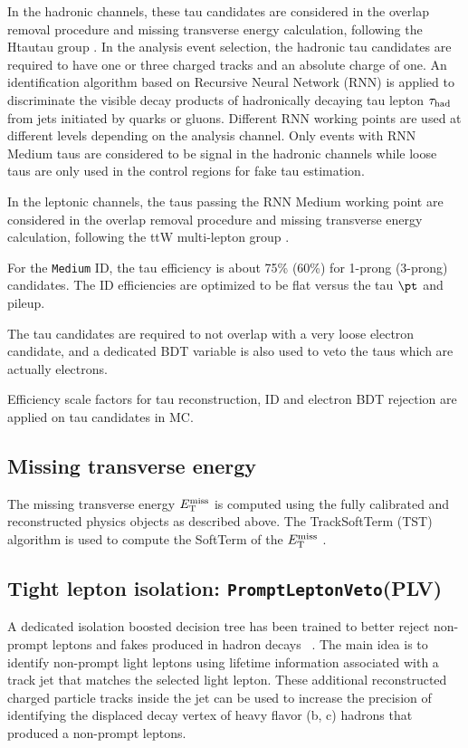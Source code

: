 In the hadronic channels, these tau candidates are considered in the overlap removal procedure and missing transverse energy calculation, following the Htautau group \cite{Htautau-note}. In the analysis event selection, the hadronic tau candidates are required to have one or three charged tracks and an absolute charge of one. An identification algorithm based on Recursive Neural Network (RNN) \cite{tau_sys2} is applied to discriminate the visible decay products of hadronically decaying tau lepton $\tau_\text{had}$ from jets initiated by quarks or gluons. Different RNN working points are used at different levels depending on the analysis channel. Only events with RNN Medium taus are considered to be signal in the hadronic channels while loose taus are only used in the control regions for fake tau estimation.

In the leptonic channels, the taus passing the RNN Medium working point are considered in the overlap removal procedure and missing transverse energy calculation, following the ttW multi-lepton group \cite{ttHMLgroup}.

For the \texttt{Medium} ID, the tau efficiency is about 75\% (60\%) for 1-prong (3-prong) candidates. The ID efficiencies are optimized to be flat versus the tau $\pt$ and pileup.

The tau candidates are required to not overlap with a very loose electron candidate, and a dedicated BDT variable is also used to veto the taus which are actually electrons.

Efficiency scale factors for tau reconstruction, ID and electron BDT rejection \cite{TauCP} are applied on tau candidates in MC.

\subsection{Missing transverse energy}
The missing transverse energy $E_{\text{T}}^{\text{miss}}$ is computed using the fully calibrated and reconstructed physics objects as described above. The TrackSoftTerm (TST) algorithm is used to compute the SoftTerm of the $E_{\text{T}}^{\text{miss}}$ \cite{MET}. 

\subsection{Tight lepton isolation: \texttt{PromptLeptonVeto}(PLV)}
\label{sec:Plv}
A dedicated isolation boosted decision tree has been trained to better reject non-prompt leptons and fakes produced in hadron decays ~\cite{ATL-COM-PHYS-2018-410}. The main idea is to identify non-prompt light leptons using lifetime information associated with a track jet that matches the selected light lepton. These additional reconstructed charged particle tracks inside the jet can be used to increase the precision of identifying the displaced decay vertex of heavy flavor (b, c) hadrons that produced a non-prompt leptons.

